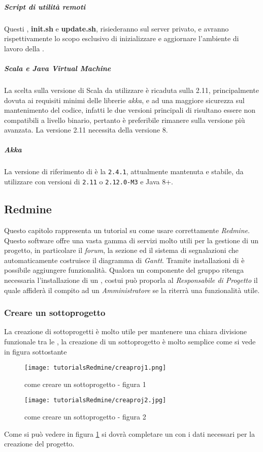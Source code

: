 \documentclass{scalatekids-article}
\begin{document}
\subparagraph{Script di utilità remoti}
Questi , \textbf{init.sh} e \textbf{update.sh}, risiederanno sul server
privato, e avranno rispettivamente lo scopo esclusivo di inizializzare e
aggiornare l'ambiente di lavoro della .
\subparagraph{Scala e Java Virtual Machine}
La scelta sulla versione di Scala da utilizzare è ricaduta sulla 
2.11, principalmente dovuta ai requisiti minimi delle librerie \textit{akka}, e
ad una maggiore sicurezza sul mantenimento del codice, infatti le due versioni
principali di  risultano essere non compatibili a livello binario,
pertanto è preferibile rimanere sulla versione più avanzata. La versione 2.11
necessita della  versione 8.
\subparagraph{Akka}
La versione di riferimento di  è la \verb=2.4.1=, attualmente
mantenuta e stabile, da utilizzare con versioni di  \verb=2.11= o
\verb=2.12.0-M3= e Java 8+.
\subsection{Redmine}
\label{sec:redmine}
Questo capitolo rappresenta un tutorial su come usare correttamente \textit{Redmine}.
Questo software offre una vasta gamma di servizi molto utili per la gestione di un progetto, in particolare il \textit{forum}, la sezione  ed il sistema di segnalazioni che automaticamente costruisce il diagramma di \textit{Gantt}. Tramite installazioni di  è possibile aggiungere funzionalità. Qualora un componente del gruppo ritenga necessaria l'installazione di un , costui può proporla al \textit{Responsabile di Progetto} il quale affiderà il compito ad un \textit{Amministratore} se la riterrà una funzionalità utile.
\subsubsection{Creare un sottoprogetto}
La creazione di sottoprogetti è molto utile per mantenere una chiara divisione funzionale tra le , la creazione di un sottoprogetto è molto semplice come si vede in figura sottostante
\begin{figure}[H]
  \centering
  \texttt{[image: tutorialsRedmine/creaproj1.png]}
  \caption{come creare un sottoprogetto - figura 1}
\end{figure}
\begin{figure}[H]
  \centering
  \texttt{[image: tutorialsRedmine/creaproj2.jpg]}
  \caption{come creare un sottoprogetto - figura 2\label{fig:figura-2}}
\end{figure}
Come si può vedere in figura \ref{fig:figura-2} si dovrà completare un  con i dati necessari per la creazione del progetto.
\end{document}
